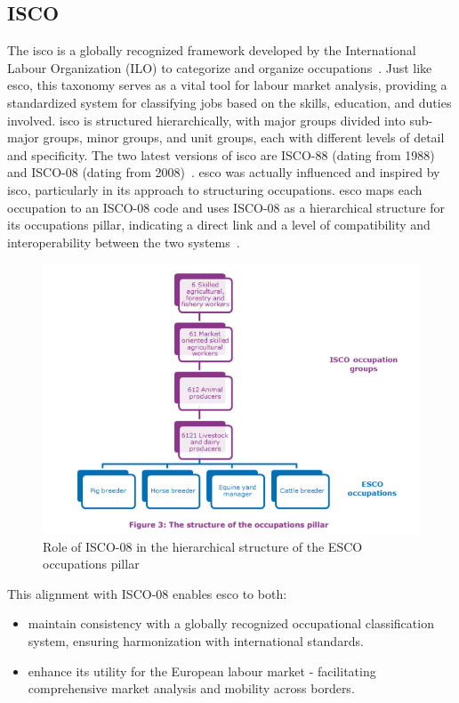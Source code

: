 \subsection{ISCO}
The \ac{isco} is a globally recognized framework developed by the International Labour Organization (ILO) to categorize and organize occupations~\cite{isco}. Just like \ac{esco}, this taxonomy serves as a vital tool for labour market analysis, providing a standardized system for classifying jobs based on the skills, education, and duties involved. \ac{isco} is structured hierarchically, with major groups divided into sub-major groups, minor groups, and unit groups, each with different levels of detail and specificity. The two latest versions of \ac{isco} are ISCO-88 (dating from 1988) and ISCO-08 (dating from 2008)~\cite{esco_isco_relation}.
\ac{esco} was actually influenced and inspired by \ac{isco}, particularly in its approach to structuring occupations. \ac{esco} maps each occupation to an ISCO-08 code and uses ISCO-08 as a hierarchical structure for its occupations pillar, indicating a direct link and a level of compatibility and interoperability between the two systems~\cite{esco_isco}.

\begin{figure}[H]
    \centering
    \includegraphics[width=15cm]{figs/esco_isco.png}
    \caption{Role of ISCO-08 in the hierarchical structure of the ESCO occupations pillar~\cite{esco_isco}}
    \label{fig:esco_isco}
\end{figure}


This alignment with ISCO-08 enables \ac{esco} to both:
\begin{itemize}
    \item maintain consistency with a globally recognized occupational classification system, ensuring harmonization with international standards.
    \item enhance its utility for the European labour market - facilitating comprehensive market analysis and mobility across borders.
\end{itemize}


